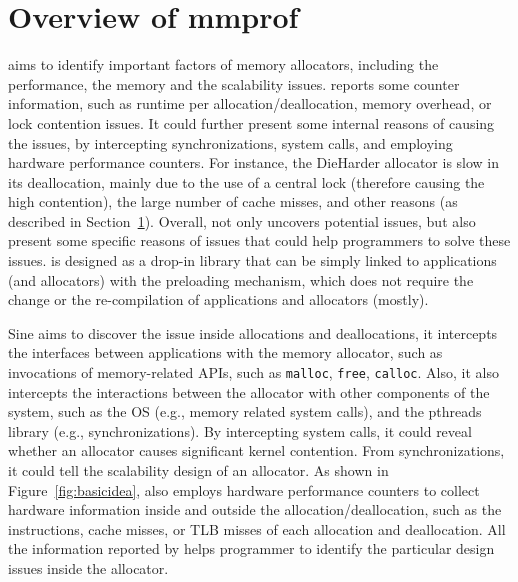 \section{Overview of mmprof}

\MP{} aims to identify important factors of memory allocators, including the performance, the memory and the scalability issues. \MP{} reports some counter information, such as runtime per allocation/deallocation, memory overhead, or lock contention issues. It could further present some internal reasons of causing the issues, by intercepting synchronizations, system calls, and employing hardware performance counters. For instance, the DieHarder allocator is slow in its deallocation, mainly due to the use of a central lock (therefore causing the high contention), the large number of cache misses, and other reasons (as described in Section~\ref{}). Overall,  \MP{} not only uncovers potential issues, but also present some specific reasons of issues that could help programmers to solve these issues. \MP{} is designed as a drop-in library that can be simply linked to applications (and allocators) with the preloading mechanism, which does not require the change or the re-compilation of applications and allocators (mostly). %

Sine \MP{} aims to discover the issue inside allocations and deallocations, it intercepts the interfaces between applications with the memory allocator, such as invocations of memory-related APIs, such as \texttt{malloc}, \texttt{free}, \texttt{calloc}. Also, it also intercepts the interactions between the allocator with other components of the system, such as the OS (e.g., memory related system calls), and the pthreads library (e.g., synchronizations). By intercepting system calls, it could reveal whether an allocator causes significant kernel contention. From synchronizations, it could tell the scalability design of an allocator. As shown in Figure~\ref{fig:basicidea}, \MP{} also employs hardware performance counters to collect hardware information inside and outside the allocation/deallocation, such as the instructions, cache misses, or TLB misses of each allocation and deallocation. All the information reported by \MP{} helps programmer to identify the particular design issues inside the allocator.  
 
